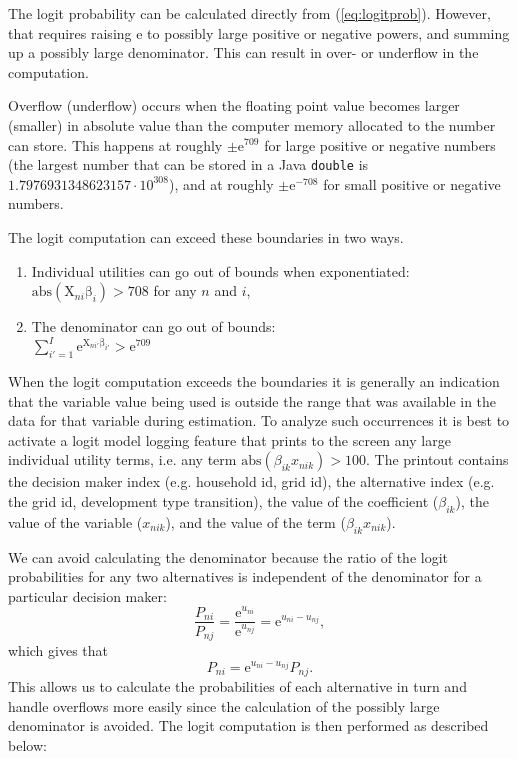 \documentclass[12pt]{article}
\newcommand{\vc}[1]{\boldsymbol{\mathrm{#1}}}
\newcommand{\e}{\mathrm{e}}
\begin{document}
The logit probability can be calculated directly from
(\ref{eq:logitprob}). However, that requires raising $\e$ to possibly
large positive or negative powers, and summing up a possibly large
denominator. This can result in over- or underflow in the computation.

Overflow (underflow) occurs when the floating point value becomes
larger (smaller) in absolute value than the computer memory allocated to the
number can store. This happens at roughly $\pm\e^{709}$ for large 
positive or negative numbers
(the largest number that can be stored in a Java \texttt{double}
is $1.7976931348623157\cdot 10^{308}$), 
and at roughly $\pm\e^{-708}$ for small positive or negative numbers.

The logit computation can exceed these boundaries in two ways. 
\begin{enumerate}
\item Individual utilities can go out of bounds when exponentiated:\\
	$\mathrm{abs}(\vc{X}_{ni}\vc{\beta}_{i})>708$ for any $n$ and $i$,
\item The denominator can go out of bounds:\\
	$\sum_{i'=1}^{I}\e^{\vc{X}_{ni'}\vc{\beta}_{i'}}>\e^{709}$
\end{enumerate}

When the logit computation exceeds the boundaries it is generally an
indication that the variable value being used is outside the range that
was available in the data for that variable during estimation. To
analyze such occurrences it is best to activate a logit model
logging feature that prints to the screen any
large individual utility terms, i.e. any
term $\mathrm{abs}(\beta_{ik}x_{nik}) > 100$. 
The printout contains the decision maker index (e.g. household id, grid id),
the alternative index (e.g. the grid id, development type transition),
the value of the coefficient ($\beta_{ik}$), the value of the variable ($x_{nik}$),
and the value of the term ($\beta_{ik}x_{nik}$).

We can avoid calculating the denominator because the ratio of the logit
probabilities for any two alternatives is independent of the denominator for a 
particular decision maker:
\begin{equation}
	\frac{P_{ni}}{P_{nj}} = \frac{\e^{u_{ni}}}{\e^{u_{nj}}} 
	= \e^{u_{ni}-u_{nj}},
\end{equation}
which gives that
\begin{equation}
  P_{ni} = \e^{u_{ni}-u_{nj}}P_{nj}.
\end{equation}
This allows us to calculate the probabilities
of each alternative in turn and handle overflows more easily since the 
calculation of the possibly large denominator is avoided. 
The logit computation is then performed as described below:
\end{document}
